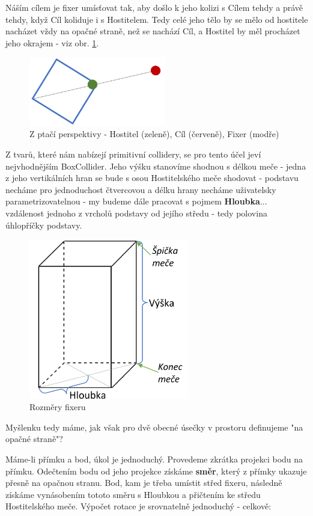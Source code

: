 Náším cílem je fixer umísťovat tak, aby došlo k jeho kolizi s Cílem tehdy a právě tehdy, když Cíl koliduje i s Hostitelem. Tedy celé jeho tělo by se mělo od hostitele nacházet vždy na opačné straně, než se nachází Cíl, a Hostitel by měl procházet jeho okrajem - viz obr. \ref{obr05:fixerBirdseye}. 
\begin{figure}[ht]\centering
  \center
  \includegraphics[height=30mm]{../img/fixerBirdseye.png}
  \caption{Z ptačí perspektivy - Hostitel (zeleně), Cíl (červeně), Fixer (modře)}
  \label{obr05:fixerBirdseye}
\end{figure} 
Z tvarů, které nám nabízejí primitivní collidery, se pro tento účel jeví nejvhodnějším BoxCollider. Jeho výšku stanovíme shodnou s délkou meče - jedna z jeho vertikálních hran se bude s osou Hostitelského meče shodovat - podstavu necháme pro jednoduchost čtvercovou a délku hrany necháme uživatelsky parametrizovatelnou - my budeme dále pracovat s pojmem \textbf{Hloubka}... vzdálenost jednoho z vrcholů podstavy od jejího středu - tedy polovina úhlopříčky podstavy.
\begin{figure}[ht]\centering
  \center
  \includegraphics[height=70mm]{../img/fixerDefinitions.png}
  \caption{Rozměry fixeru}
  \label{obr05:fixerDefinitions}
\end{figure} 

Myšlenku tedy máme, jak však pro dvě obecné úsečky v prostoru definujeme "na opačné straně"?

\bigbreak

Máme-li přímku a bod, úkol je jednoduchý. Provedeme zkrátka projekci bodu na přímku. Odečtením bodu od jeho projekce získáme \textbf{směr}, který z přímky ukazuje přesně na opačnou stranu. Bod, kam je třeba umístit střed fixeru, následně získáme vynásobením tototo směru s Hloubkou a přičtením ke středu Hostitelského meče. Výpočet rotace je srovnatelně jednoduchý - celkově:   

